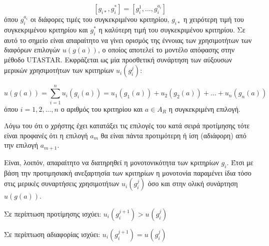 \documentclass[12pt,a4paper,titlepage]{article}
\numberwithin{equation}{section}
\begin{document}
\begin{equation}\label{}
[g_{i*},g^{*}_{i}] = [g^{1}_{i}, ..., g^{a_{i}}_{i}]
\end{equation}
όπου $g^{a_{i}}_{i}$ οι διάφορες τιμές του συγκεκριμένου κριτηρίου, $g_{i*}$ η χειρότερη τιμή του συγκεκριμένου κριτηρίου και $g^{*}_{i}$ η καλύτερη τιμή του συγκεκριμένου κριτηρίου. 	
Σε αυτό το σημείο είναι απαραίτητο να γίνει ορισμός της έννοιας των χρησιμοτήτων των διαφόρων επιλογών $u(g(a))$, ο οποίος αποτελεί το μοντέλο απόφασης στην μέθοδο UTASTAR. Eκφράζεται ως μία προσθετική συνάρτηση των αύξουσων μερικών χρησιμοτήτων των κριτηρίων $u_{i}(g^{j}_{i})$:

\begin{equation}\label{}
	u(g(a)) = \sum_{i=1}^{n} u_{i}(g_{i}(a)) = u_{1}(g_{1}(a)) + u_{2}(g_{2}(a)) + ... + u_{n}(g_{n}(a))
\end{equation}
όπου $i = 1,2,...,n$ ο αριθμός του κριτηρίου και $a\in A_{R}$ η συγκεκριμένη επιλογή.

Λόγω του ότι ο χρήστης έχει κατατάξει τις επιλογές του κατά σειρά προτίμησης τότε είναι προφανές ότι η επιλογή $a_{m}$ θα είναι πάντα προτιμότερη ή ίση (αδιάφορη) από την επιλογή $a_{m+1}$.    

Είναι, λοιπόν, απαραίτητο να διατηρηθεί η μονοτονικότητα των κριτηρίων $g_{i}$. Έτσι με βάση την προτιμησιακή ανεξαρτησία των κριτηρίων η μονοτονία παραμένει ίδια τόσο στις μερικές συναρτήσεις χρησιμοτήτων $u_{i}(g^{j}_{i})$ όσο και στην ολική συνάρτηση  $u(g(a))$.

Σε περίπτωση προτίμησης ισχύει: $u_{i}(g^{j+1}_{i}) > u_{}(g^{j}_{i})$

Σε περίπτωση αδιαφορίας ισχύει: $u_{i}(g^{j+1}_{i}) = u_{}(g^{j}_{i})$
\end{document}
